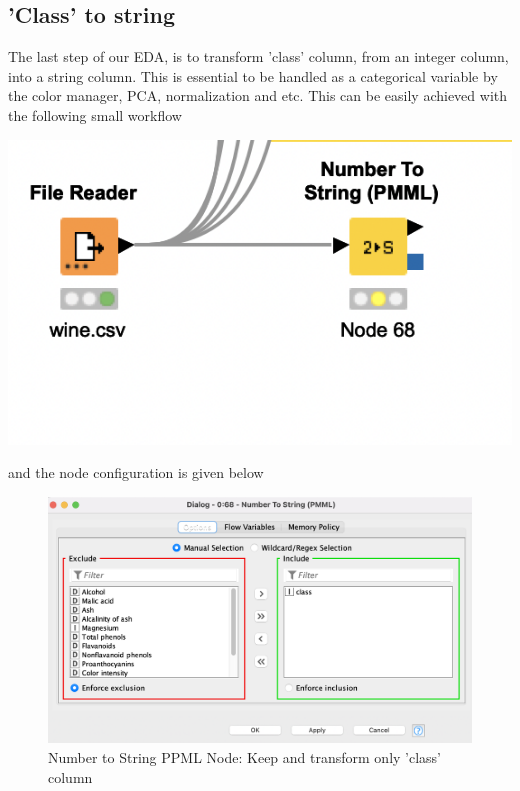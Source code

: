 \documentclass[11pt]{article}
\begin{document}
		\subsection*{'Class' to  string}
			The last step of our EDA, is to transform 'class' column, from an integer column, into a string column. This is essential to be handled as a categorical variable by the color manager, PCA, normalization and etc. This can be easily achieved with the following small workflow
			\iftrue
			\begin{center}
				\includegraphics[scale=0.5]{res/t0/t04/t04-workflow}
			\end{center}
			\fi
			and the node configuration is given below
			\iftrue
			\begin{figure}[H]
				\centering
				\includegraphics[scale=0.3]{res/t0/t04/t04-number-to-string-ppml-conf}
				\caption{Number to String PPML Node: Keep and transform only 'class' column}
				\label{fig:second}
			\end{figure}
			\fi
\end{document}
